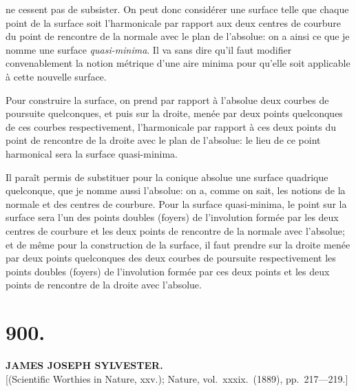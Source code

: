 \documentclass[11pt,a4paper]{article}
\begin{document}
ne cessent pas de subsister. On peut donc consid\'erer une surface telle que chaque point de la surface soit l'harmonicale par rapport aux deux centres de courbure du point de rencontre de la normale avec le plan de l'absolue: on a ainsi ce que je nomme une surface \emph{quasi-minima}. Il va sans dire qu'il faut modifier convenablement la notion m\'etrique d'une aire minima pour qu'elle soit applicable \`a cette nouvelle surface.

Pour construire la surface, on prend par rapport \`a l'absolue deux courbes de poursuite quelconques, et puis sur la droite, men\'ee par deux points quelconques de ces courbes respectivement, l'harmonicale par rapport \`a ces deux points du point de rencontre de la droite avec le plan de l'absolue: le lieu de ce point harmonical sera la surface quasi-minima.

Il para\^it permis de substituer pour la conique absolue une surface quadrique quelconque, que je nomme aussi l'absolue: on a, comme on sait, les notions de la normale et des centres de courbure. Pour la surface quasi-minima, le point sur la surface sera l'un des points doubles (foyers) de l'involution form\'ee par les deux centres de courbure et les deux points de rencontre de la normale avec l'absolue; et de m\^eme pour la construction de la surface, il faut prendre sur la droite men\'ee par deux points quelconques des deux courbes de poursuite respectivement les points doubles (foyers) de l'involution form\'ee par ces deux points et les deux points de rencontre de la droite avec l'absolue.


\section*{900.}
\begin{center}
{\large\bfseries JAMES JOSEPH SYLVESTER.}\\[0.5em]
\small [(Scientific Worthies in Nature, xxv.); Nature, vol.\ xxxix.\ (1889), pp.\ 217---219.]
\end{center}
\end{document}
